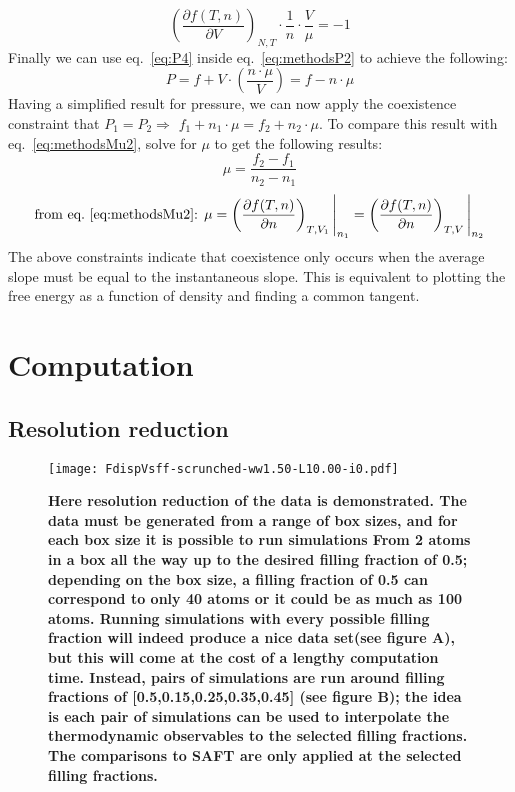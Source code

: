 \begin{equation}\label{eq:P4}
\left(\frac{\partial f(T,n)}{\partial V}\right)_{N,T} \cdot \frac{1}{n} \cdot \frac{V}{\mu}=-1
\end{equation}
Finally we can use eq.~\ref{eq:P4} inside eq.~\ref{eq:methodsP2} to achieve the following:
\begin{equation}\label{eq:P5}
P=f+V\cdot\left( \frac{n\cdot \mu}{V} \right)=f-n\cdot\mu
\end{equation}
Having a simplified result for pressure, we can now apply the coexistence constraint that $P_1=P_2 \Rightarrow$ $f_1+n_1\cdot\mu=f_2+n_2\cdot\mu$. To compare this result with eq.~\ref{eq:methodsMu2}, solve for $\mu$ to get the following results:
\begin{equation}\label{eq:mu3p}
\mu=\frac{f_2-f_1}{n_2-n_1}
\end{equation}
\begin{equation}\label{eq:mu3}
\text{from eq.~\ref{eq:methodsMu2}: }\mu= \left(\frac{\partial f(T,n)}{\partial n}\right)_{T,V_1}\Bigg|_{n_1}=\left(\frac{\partial f(T,n)}{\partial n}\right)_{T,V}\Bigg|_{n_2}
\end{equation}
The above constraints indicate that coexistence only occurs when the average slope must be equal to the instantaneous slope. This is equivalent to plotting the free energy as a function of density and finding a common tangent.

\newpage
\section{Computation}
\vspace*{-5mm}
\subsection{Resolution reduction}
\begin{figure}[h]
\vspace*{-7mm}
\hspace*{-6mm}
	\centering
	\texttt{[image: FdispVsff-scrunched-ww1.50-L10.00-i0.pdf]}
	\caption{\label{fig:FdispVsff}
	\scriptsize \textbf{Here resolution reduction of the data is demonstrated. The data must be generated from a range of box sizes, and for each box size it is possible to run simulations From 2 atoms in a box all the way up to the desired filling fraction of 0.5; depending on the box size, a filling fraction of 0.5 can correspond to only 40 atoms or it could be as much as 100 atoms. Running simulations with every possible filling fraction will indeed produce a nice data set(see figure A), but this will come at the cost of a lengthy computation time. Instead, pairs of simulations are run around filling fractions of [0.5,0.15,0.25,0.35,0.45] (see figure B); the idea is each pair of simulations can be used to interpolate the thermodynamic observables to the selected filling fractions. The comparisons to SAFT are only applied at the selected filling fractions.}}
	
\end{figure}
\vspace*{-10mm}
